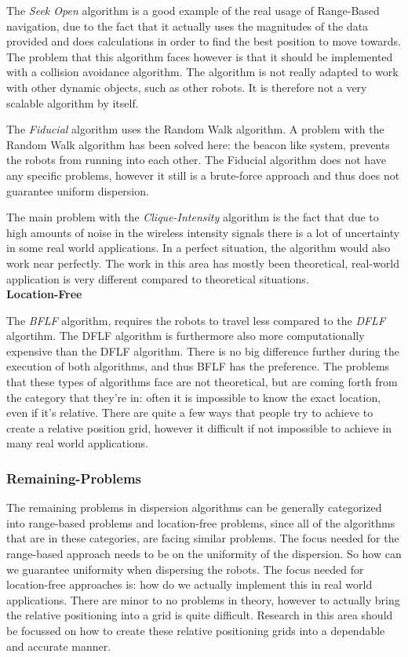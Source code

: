  The \emph{Seek Open} algorithm is a good example of the real usage of Range-Based navigation, due to the fact that it actually uses the magnitudes of the data provided and does calculations in order to find the best position to move towards. The problem that this algorithm faces however is that it should be implemented with a collision avoidance algorithm. The algorithm is not really adapted to work with other dynamic objects, such as other robots. It is therefore not a very scalable algorithm by itself.

  The \emph{Fiducial} algorithm uses the Random Walk algorithm. A problem with the Random Walk algorithm has been solved here: the beacon like system, prevents the robots from running into each other. The Fiducial algorithm does not have any specific problems, however it still is a brute-force approach and thus does not guarantee uniform dispersion.

  The main problem with the \emph{Clique-Intensity} algorithm is the fact that due to high amounts of noise in the wireless intensity signals there is a lot of uncertainty in some real world applications. In a perfect situation, the algorithm would also work near perfectly. The work in this area has mostly been theoretical, real-world application is very different compared to theoretical situations.\\

  \textbf{Location-Free}

  The \emph{BFLF} algorithm, requires the robots to travel less compared to the \emph{DFLF} algortihm. The DFLF algorithm is furthermore also more computationally expensive than the DFLF algorithm. There is no big difference further during the execution of both algorithms, and thus BFLF has the preference. The problems that these types of algorithms face are not theoretical, but are coming forth from the category that they're in: often it is impossible to know the exact location, even if it's relative. There are quite a few ways that people try to achieve to create a relative position grid, however it difficult if not impossible to achieve in many real world applications.\\

\subsubsection{Remaining-Problems}
  The remaining problems in dispersion algorithms can be generally categorized into range-based problems and location-free problems, since all of the algorithms that are in these categories, are facing similar problems.
  The focus needed for the range-based approach needs to be on the uniformity of the dispersion. So how can we guarantee uniformity when dispersing the robots.
  The focus needed for location-free approaches is: how do we actually implement this in real world applications. There are minor to no problems in theory, however to actually bring the relative positioning into a grid is quite difficult. Research in this area should be focussed on how to create these relative positioning grids into a dependable and accurate manner.

